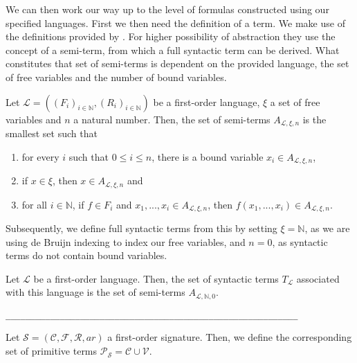 We can then work our way up to the level of formulas constructed using our specified languages. First we then need the definition of a term. We make use of the definitions provided by \cite{ffl}. For higher possibility of abstraction they use the concept of a semi-term, from which a full syntactic term can be derived. What constitutes that set of semi-terms is dependent on the provided language, the set of free variables and the number of bound variables.

\begin{definition}\label{def:semi-term}
    \leanok
    Let $\mathcal{L} = ((F_i)_{i \in \mathbb{N}},(R_i)_{i \in \mathbb{N}})$ be a first-order language, $\xi$ a set of free variables and $n$ a natural number. Then, the set of semi-terms $A_{\mathcal{L},\xi,n}$ is the smallest set such that
    \begin{enumerate}
        \item for every $i$ such that $0 \leq i \leq n$, there is a bound variable $x_i \in A_{\mathcal{L},\xi,n}$,
        \item if $x \in \xi$, then $x \in A_{\mathcal{L},\xi,n}$ and
        \item for all $i \in \mathbb{N}$, if $f \in F_i$ and $x_1,...,x_i \in A_{\mathcal{L},\xi,n}$, then $f(x_1,...,x_i) \in A_{\mathcal{L},\xi,n}$.
    \end{enumerate}
\end{definition}

Subsequently, we define full syntactic terms from this by setting $\xi = \mathbb{N}$, as we are using de Bruijn indexing to index our free variables, and $n = 0$, as syntactic terms do not contain bound variables.

\begin{definition}\label{def:syntacticterm}
    \leanok
    Let $\mathcal{L}$ be a first-order language. Then, the set of syntactic terms $T_{\mathcal{L}}$ associated with this language is the set of semi-terms $A_{\mathcal{L},\mathbb{N},0}$. 
\end{definition}

\verb|___________________________________________________________|

\begin{definition}%
    Let $\mathcal{S} = (\mathcal{C},\mathcal{F},\mathcal{R},ar)$ a first-order signature. Then, we define the corresponding set of primitive terms $\mathcal{P}_{\mathcal{S}} = \mathcal{C} \cup \mathcal{V}$.
\end{definition}


